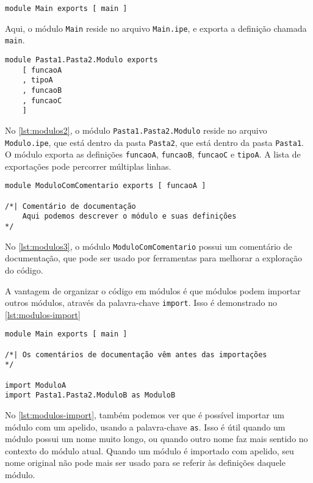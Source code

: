 \begin{lstlisting}[label={lst:modulos},caption={Exemplo de módulos}]
module Main exports [ main ]
\end{lstlisting}

Aqui, o módulo \texttt{Main} reside no arquivo \texttt{Main.ipe}, e exporta a
definição chamada \texttt{main}.

\begin{lstlisting}[label={lst:modulos2},caption={Exemplo de módulo em subpasta que exporta várias definições}]
module Pasta1.Pasta2.Modulo exports
    [ funcaoA
    , tipoA
    , funcaoB
    , funcaoC
    ]
\end{lstlisting}

No \autoref{lst:modulos2}, o módulo \texttt{Pasta1.Pasta2.Modulo} reside no arquivo
\texttt{Modulo.ipe}, que está dentro da pasta \texttt{Pasta2}, que está dentro da
pasta \texttt{Pasta1}. O módulo exporta as definições \texttt{funcaoA}, \texttt{funcaoB},
\texttt{funcaoC} e \texttt{tipoA}. A lista de exportações pode percorrer múltiplas
linhas.

\begin{lstlisting}[label={lst:modulos3},caption={Exemplo de módulo com comentário de documentação}]
module ModuloComComentario exports [ funcaoA ]

/*| Comentário de documentação
    Aqui podemos descrever o módulo e suas definições
*/
\end{lstlisting}

No \autoref{lst:modulos3}, o módulo \texttt{ModuloComComentario} possui um comentário
de documentação, que pode ser usado por ferramentas para melhorar a exploração
do código.

A vantagem de organizar o código em módulos é que módulos podem importar outros
módulos, através da palavra-chave \texttt{import}. Isso é demonstrado no
\autoref{lst:modulos-import}

\begin{lstlisting}[label={lst:modulos-import},caption={Exemplo de importação de módulos}]
module Main exports [ main ]

/*| Os comentários de documentação vêm antes das importações
*/

import ModuloA
import Pasta1.Pasta2.ModuloB as ModuloB
\end{lstlisting}

No \autoref{lst:modulos-import}, também podemos ver que é possível importar um
módulo com um apelido, usando a palavra-chave \texttt{as}. Isso é útil quando
um módulo possui um nome muito longo, ou quando outro nome faz mais sentido no
contexto do módulo atual. Quando um módulo é importado com apelido, seu nome
original não pode mais ser usado para se referir às definições daquele módulo.

